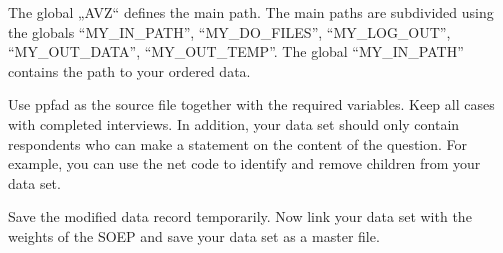 \documentclass[letterpaper,10pt,openany,onesideH,english]{sphinxmanual}
\begin{document}
The global „AVZ“ defines the main path. The main paths are subdivided using the globals “MY\_IN\_PATH”, “MY\_DO\_FILES”, “MY\_LOG\_OUT”, “MY\_OUT\_DATA”, “MY\_OUT\_TEMP”. The global “MY\_IN\_PATH” contains the path to your ordered data.

Use ppfad as the source file together with the required variables. Keep all cases with completed interviews. In addition, your data set should only contain respondents who can make a statement on the content of the question. For example, you can use the net code to identify and remove children from your data set.

%
\begin{sphinxVerbatim}[commandchars=\\\{\},numbers=left,firstnumber=1,stepnumber=1]
      

          


        

          


         

          


       

 
  
\end{sphinxVerbatim}

Save the modified data record temporarily.
Now link your data set with the weights of the SOEP and save your data set as a master file.
\end{document}
